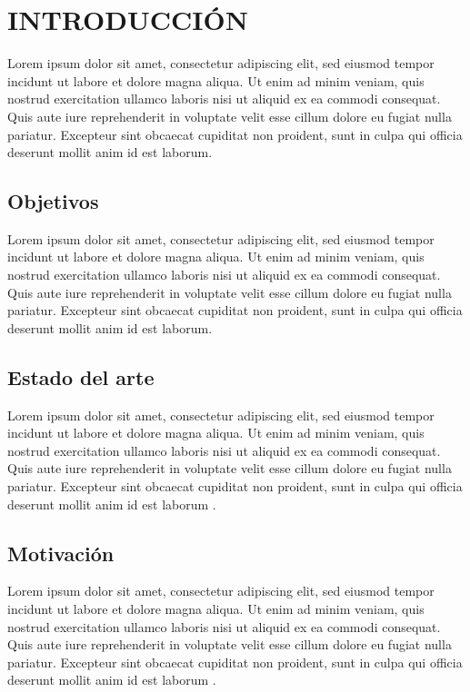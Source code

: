 \chapter{INTRODUCCIÓN} \label{cap:1}          %

Lorem ipsum dolor sit amet, consectetur adipiscing elit, sed eiusmod tempor incidunt ut labore et dolore magna aliqua. Ut enim ad minim veniam, quis nostrud exercitation ullamco laboris nisi ut aliquid ex ea commodi consequat. Quis aute iure reprehenderit in voluptate velit esse cillum dolore eu fugiat nulla pariatur. Excepteur sint obcaecat cupiditat non proident, sunt in culpa qui officia deserunt mollit anim id est laborum.

\section{Objetivos}

Lorem ipsum dolor sit amet, consectetur adipiscing elit, sed eiusmod tempor incidunt ut labore et dolore magna aliqua. Ut enim ad minim veniam, quis nostrud exercitation ullamco laboris nisi ut aliquid ex ea commodi consequat. Quis aute iure reprehenderit in voluptate velit esse cillum dolore eu fugiat nulla pariatur. Excepteur sint obcaecat cupiditat non proident, sunt in culpa qui officia deserunt mollit anim id est laborum.

\section{Estado del arte}

Lorem ipsum dolor sit amet, consectetur adipiscing elit, sed eiusmod tempor incidunt ut labore et dolore magna aliqua. Ut enim ad minim veniam, quis nostrud exercitation ullamco laboris nisi ut aliquid ex ea commodi consequat. Quis aute iure reprehenderit in voluptate velit esse cillum dolore eu fugiat nulla pariatur. Excepteur sint obcaecat cupiditat non proident, sunt in culpa qui officia deserunt mollit anim id est laborum \cite{bib01}.

\section{Motivación}

Lorem ipsum dolor sit amet, consectetur adipiscing elit, sed eiusmod tempor incidunt ut labore et dolore magna aliqua. Ut enim ad minim veniam, quis nostrud exercitation ullamco laboris nisi ut aliquid ex ea commodi consequat. Quis aute iure reprehenderit in voluptate velit esse cillum dolore eu fugiat nulla pariatur. Excepteur sint obcaecat cupiditat non proident, sunt in culpa qui officia deserunt mollit anim id est laborum \cite{bib01}.

